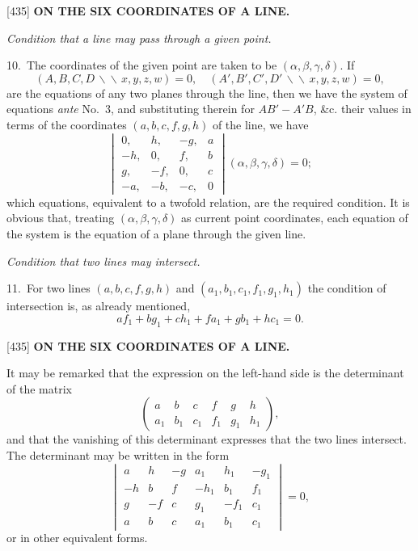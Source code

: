\documentclass[12pt,a4paper]{article}
\newcommand{\paperref}[1]{\textup{[#1]}}
\theoremstyle{definition}
\begin{document}
\newpage
\setcounter{page}{70}

\noindent\paperref{435}\quad
\textbf{ON THE SIX COORDINATES OF A LINE.}

\textit{Condition that a line may pass through a given point.}

10.~The coordinates of the given point are taken to be $(\alpha, \beta, \gamma, \delta)$. If
\[
(A, B, C, D \,\backslash\!\!\backslash\, x, y, z, w) = 0, \quad
(A', B', C', D' \,\backslash\!\!\backslash\, x, y, z, w) = 0,
\]
are the equations of any two planes through the line, then we have the system of equations \textit{ante} No.~3, and substituting therein for $AB' - A'B$, \&c. their values in terms of the coordinates $(a, b, c, f, g, h)$ of the line, we have
\[
\begin{vmatrix}
0, & h, & -g, & a \\
-h, & 0, & f, & b \\
g, & -f, & 0, & c \\
-a, & -b, & -c, & 0
\end{vmatrix}
(\alpha, \beta, \gamma, \delta) = 0;
\]
which equations, equivalent to a twofold relation, are the required condition. It is obvious that, treating $(\alpha, \beta, \gamma, \delta)$ as current point coordinates, each equation of the system is the equation of a plane through the given line.

\textit{Condition that two lines may intersect.}

11.~For two lines $(a, b, c, f, g, h)$ and $(a_1, b_1, c_1, f_1, g_1, h_1)$ the condition of intersection is, as already mentioned,
\[
a f_1 + b g_1 + c h_1 + f a_1 + g b_1 + h c_1 = 0.
\]

\newpage
\setcounter{page}{71}

\noindent\paperref{435}\quad
\textbf{ON THE SIX COORDINATES OF A LINE.}

It may be remarked that the expression on the left-hand side is the determinant of the matrix
\[
\begin{pmatrix}
a & b & c & f & g & h \\
a_1 & b_1 & c_1 & f_1 & g_1 & h_1
\end{pmatrix},
\]
and that the vanishing of this determinant expresses that the two lines intersect. The determinant may be written in the form
\[
\begin{vmatrix}
a & h & -g & a_1 & h_1 & -g_1 \\
-h & b & f & -h_1 & b_1 & f_1 \\
g & -f & c & g_1 & -f_1 & c_1 \\
a & b & c & a_1 & b_1 & c_1
\end{vmatrix}
= 0,
\]
or in other equivalent forms.
\end{document}
